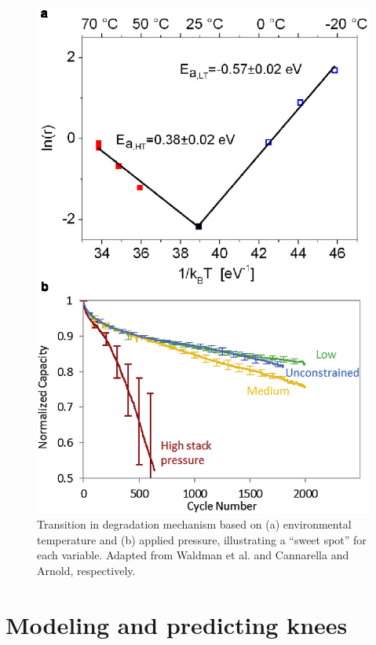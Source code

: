 \documentclass[journal=jpclcd,manuscript=article]{achemso}
\begin{document}
\begin{figure}[ht!]
\centering
\includegraphics[scale = 1.0]{figures/temperature_pressure_sweet_spot.eps}
\caption{Transition in degradation mechanism based on (a) environmental temperature and (b) applied pressure, illustrating a ``sweet spot'' for each variable. Adapted from Waldman et al.\cite{waldmann_temperature_2014} and Cannarella and Arnold\cite{cannarella_stress_2014}, respectively.}
\label{fig:temperature_and_pressure}
\end{figure}

\section{Modeling and predicting knees}
\end{document}

